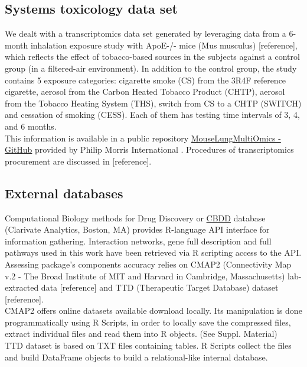 \subsection{Systems toxicology data set}
We dealt with a transcriptomics data set generated by leveraging data from a 6-month inhalation exposure study with ApoE-/- mice (Mus musculus) [reference], which reflects the effect of tobacco-based sources in the subjects against a control group (in a filtered-air environment). In addition to the control group, the study contains 5 exposure categories: cigarette smoke (CS) from the 3R4F reference cigarette, aerosol from the Carbon Heated Tobacco Product (CHTP), aerosol from the Tobacco Heating System (THS), switch from CS to a CHTP (SWITCH) and cessation of smoking (CESS). Each of them has testing time intervals of 3, 4, and 6 months.
\\

This information is available in a public repository \href{https://github.com/philipmorrisintl/MouseLungMultiOmics}{MouseLungMultiOmics - GitHub} provided by Philip Morris International \cite{Titz2020Multi-omicsSmoke}. Procedures of transcriptomics procurement are discussed in [reference].
\\

\subsection{External databases}
Computational Biology methods for Drug Discovery or \href{https://genestack.com/news/blog/case-study-clarivate-analytics/}{CBDD} database (Clarivate Analytics, Boston, MA) provides R-language API interface for information gathering. Interaction networks, gene full description and full pathways used in this work have been retrieved via R scripting access to the API.
\\

Assessing package’s components accuracy relies on CMAP2 (Connectivity Map v.2 - The Broad Institute of MIT and Harvard in Cambridge, Massachusetts) lab-extracted data [reference] and TTD (Therapeutic Target Database) dataset [reference].
\\

CMAP2 offers online datasets available download locally. Its manipulation is done programmatically using R Scripts, in order to locally save the compressed files, extract individual files and read them into R objects. (See Suppl. Material)
\\

TTD dataset is based on TXT files containing tables. R Scripts collect the files and build DataFrame objects to build a relational-like internal database.
\\

